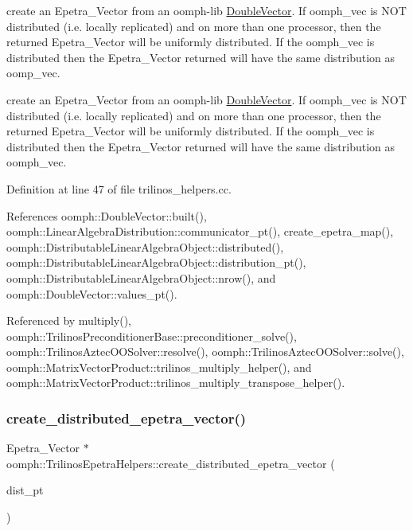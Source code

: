 create an Epetra\+\_\+\+Vector from an oomph-\/lib \hyperlink{classoomph_1_1DoubleVector}{Double\+Vector}. If oomph\+\_\+vec is N\+OT distributed (i.\+e. locally replicated) and on more than one processor, then the returned Epetra\+\_\+\+Vector will be uniformly distributed. If the oomph\+\_\+vec is distributed then the Epetra\+\_\+\+Vector returned will have the same distribution as oomp\+\_\+vec. 

create an Epetra\+\_\+\+Vector from an oomph-\/lib \hyperlink{classoomph_1_1DoubleVector}{Double\+Vector}. If oomph\+\_\+vec is N\+OT distributed (i.\+e. locally replicated) and on more than one processor, then the returned Epetra\+\_\+\+Vector will be uniformly distributed. If the oomph\+\_\+vec is distributed then the Epetra\+\_\+\+Vector returned will have the same distribution as oomph\+\_\+vec. 

Definition at line 47 of file trilinos\+\_\+helpers.\+cc.



References oomph\+::\+Double\+Vector\+::built(), oomph\+::\+Linear\+Algebra\+Distribution\+::communicator\+\_\+pt(), create\+\_\+epetra\+\_\+map(), oomph\+::\+Distributable\+Linear\+Algebra\+Object\+::distributed(), oomph\+::\+Distributable\+Linear\+Algebra\+Object\+::distribution\+\_\+pt(), oomph\+::\+Distributable\+Linear\+Algebra\+Object\+::nrow(), and oomph\+::\+Double\+Vector\+::values\+\_\+pt().



Referenced by multiply(), oomph\+::\+Trilinos\+Preconditioner\+Base\+::preconditioner\+\_\+solve(), oomph\+::\+Trilinos\+Aztec\+O\+O\+Solver\+::resolve(), oomph\+::\+Trilinos\+Aztec\+O\+O\+Solver\+::solve(), oomph\+::\+Matrix\+Vector\+Product\+::trilinos\+\_\+multiply\+\_\+helper(), and oomph\+::\+Matrix\+Vector\+Product\+::trilinos\+\_\+multiply\+\_\+transpose\+\_\+helper().

\mbox{\label{namespaceoomph_1_1TrilinosEpetraHelpers_abdba45d59fca1a4509df5a1c6b44d0bc}} 
\subsubsection{\texorpdfstring{create\+\_\+distributed\+\_\+epetra\+\_\+vector()}{create\_distributed\_epetra\_vector()}\hspace{0.1cm}{\footnotesize\ttfamily [2/2]}}
{\footnotesize\ttfamily Epetra\+\_\+\+Vector $\ast$ oomph\+::\+Trilinos\+Epetra\+Helpers\+::create\+\_\+distributed\+\_\+epetra\+\_\+vector (\begin{DoxyParamCaption}\item[{const \hyperlink{classoomph_1_1LinearAlgebraDistribution}{Linear\+Algebra\+Distribution} $\ast$}]{dist\+\_\+pt }\end{DoxyParamCaption})}



